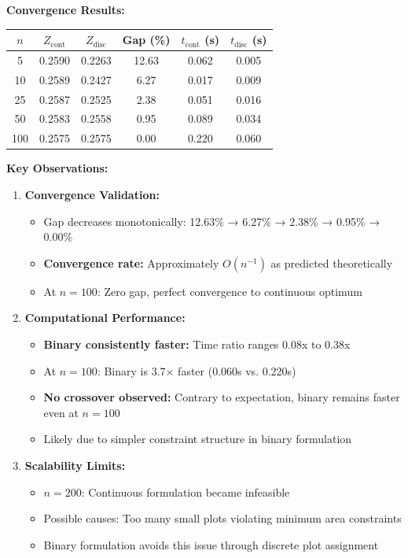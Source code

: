 \documentclass{oqireport}
\begin{document}
\textbf{Convergence Results:}

\begin{center}
\begin{tabular}{cccccc}
\hline
$n$ & $Z_{\text{cont}}$ & $Z_{\text{disc}}$ & Gap (\%) & $t_{\text{cont}}$ (s) & $t_{\text{disc}}$ (s) \\
\hline
5 & 0.2590 & 0.2263 & 12.63 & 0.062 & 0.005 \\
10 & 0.2589 & 0.2427 & 6.27 & 0.017 & 0.009 \\
25 & 0.2587 & 0.2525 & 2.38 & 0.051 & 0.016 \\
50 & 0.2583 & 0.2558 & 0.95 & 0.089 & 0.034 \\
100 & 0.2575 & 0.2575 & 0.00 & 0.220 & 0.060 \\
\hline
\end{tabular}
\end{center}

\textbf{Key Observations:}

\begin{enumerate}
    \item \textbf{Convergence Validation:}
    \begin{itemize}
        \item Gap decreases monotonically: 12.63\% → 6.27\% → 2.38\% → 0.95\% → 0.00\%
        \item \textbf{Convergence rate:} Approximately $O(n^{-1})$ as predicted theoretically
        \item At $n = 100$: Zero gap, perfect convergence to continuous optimum
    \end{itemize}
    
    
    \item \textbf{Computational Performance:}
    \begin{itemize}
        \item \textbf{Binary consistently faster:} Time ratio ranges 0.08x to 0.38x
        \item At $n = 100$: Binary is 3.7$\times$ faster (0.060s vs. 0.220s)
        \item \textbf{No crossover observed:} Contrary to expectation, binary remains faster even at $n = 100$
        \item Likely due to simpler constraint structure in binary formulation
    \end{itemize}
    
    \item \textbf{Scalability Limits:}
    \begin{itemize}
        \item $n = 200$: Continuous formulation became infeasible
        \item Possible causes: Too many small plots violating minimum area constraints
        \item Binary formulation avoids this issue through discrete plot assignment
    \end{itemize}
\end{enumerate}
\end{document}
